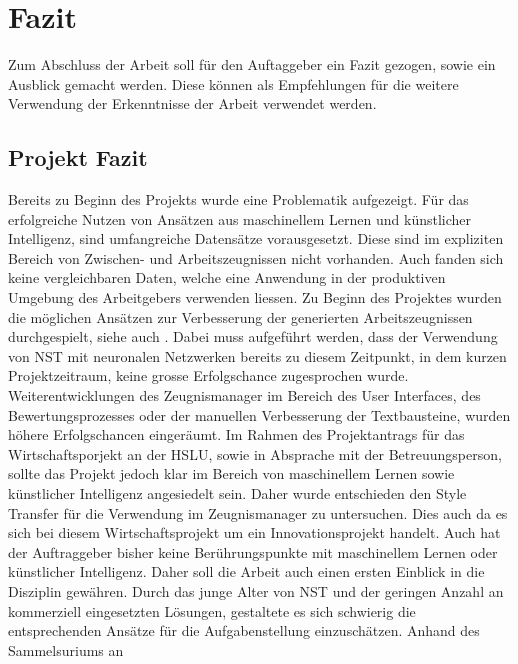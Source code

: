 \chapter{Fazit}
\label{ch:Fazit}

Zum Abschluss der Arbeit soll für den Auftaggeber ein Fazit gezogen, sowie ein Ausblick gemacht werden. Diese können als
Empfehlungen für die weitere Verwendung der Erkenntnisse der Arbeit verwendet werden.

\section{Projekt Fazit}
\label{projekt_fazit}
Bereits zu Beginn des Projekts wurde eine Problematik aufgezeigt. Für das erfolgreiche Nutzen von Ansätzen aus
maschinellem Lernen und künstlicher Intelligenz, sind umfangreiche Datensätze vorausgesetzt. Diese sind im expliziten
Bereich von Zwischen- und Arbeitszeugnissen nicht vorhanden. Auch fanden sich keine vergleichbaren Daten, welche eine
Anwendung in der produktiven Umgebung des Arbeitgebers verwenden liessen. Zu Beginn des Projektes wurden die möglichen
Ansätzen zur Verbesserung der generierten Arbeitszeugnissen durchgespielt, siehe auch
. Dabei muss aufgeführt werden, dass der Verwendung von \gls{NST} mit
neuronalen Netzwerken bereits zu diesem Zeitpunkt, in dem kurzen Projektzeitraum, keine grosse Erfolgschance
zugesprochen wurde. Weiterentwicklungen des Zeugnismanager im Bereich des User Interfaces, des Bewertungsprozesses 
oder der manuellen Verbesserung der Textbausteine, wurden höhere Erfolgschancen eingeräumt. 
\newline
\newline
Im Rahmen des Projektantrags für das Wirtschaftsporjekt an der HSLU, sowie in Absprache mit der Betreuungsperson, sollte
das Projekt jedoch klar im Bereich von maschinellem Lernen sowie künstlicher Intelligenz angesiedelt sein. Daher wurde
entschieden den Style Transfer für die Verwendung im Zeugnismanager zu untersuchen. Dies auch da es sich bei diesem
Wirtschaftsprojekt um ein Innovationsprojekt handelt. Auch hat der Auftraggeber bisher keine Berührungspunkte mit
maschinellem Lernen oder künstlicher Intelligenz. Daher soll die Arbeit auch einen ersten Einblick in die Disziplin
gewähren.
\newline
\newline
Durch das junge Alter von \gls{NST} und der geringen Anzahl an kommerziell eingesetzten Lösungen, gestaltete
es sich schwierig die entsprechenden Ansätze für die Aufgabenstellung einzuschätzen. Anhand des Sammelsuriums an
